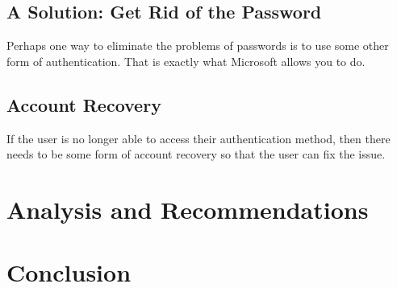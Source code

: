 \documentclass[12pt, letterpaper]{article}
\begin{document}

\subsection{A Solution: Get Rid of the Password}
Perhaps one way to eliminate the problems of passwords is to use some other form of authentication.
That is exactly what Microsoft allows you to do. 

\subsection{Account Recovery}
If the user is no longer able to access their authentication method, then there needs to be some form of account recovery so that the user can fix the issue.

\section{Analysis and Recommendations}
\section{Conclusion}

\printbibliography
\end{document}
